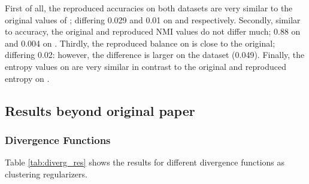 First of all, the reproduced accuracies on both datasets are very similar to the original values of \citet{Li_2020_CVPR}; differing 0.029 and 0.01 on \revMNIST and \USPSMNIST respectively. Secondly, similar to accuracy, the original and reproduced NMI values do not differ much; 0.88 on \revMNIST and 0.004 on \USPSMNIST. Thirdly, the reproduced balance on \revMNIST is close to the original; differing 0.02: however, the difference is larger on the \USPSMNIST dataset (0.049).
Finally, the entropy values on \revMNIST are very similar in contrast to the original and reproduced entropy on \USPSMNIST.

\subsection{Results beyond original paper}
 
\subsubsection{Divergence Functions}

Table \ref{tab:diverg_res} shows the results for different divergence functions as clustering regularizers.

